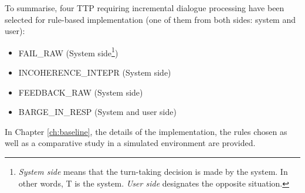 				To summarise, four TTP requiring incremental dialogue processing have been selected for rule-based implementation (one of them from both sides: system and user):
				\begin{itemize}
					\item FAIL\_RAW (System side\footnote{\textit{System side} means that the turn-taking decision is made by the system. In other words, T is the system. \textit{User side} designates the opposite situation.})
					\item INCOHERENCE\_INTEPR (System side)
					\item FEEDBACK\_RAW (System side)
					\item BARGE\_IN\_RESP (System and user side)
				\end{itemize}

				In Chapter \ref{ch:baseline}, the details of the implementation, the rules chosen as well as a comparative study in a simulated environment are provided.
